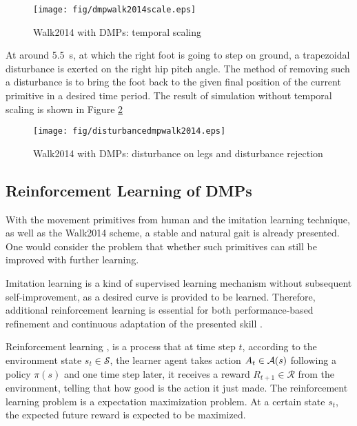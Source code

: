 \begin{figure}[H]
	\centering
	\texttt{[image: fig/dmpwalk2014scale.eps]}
	\caption{Walk2014 with DMPs: temporal scaling}
	\label{dmpwalk2014scale}
\end{figure}

At around \SI{5.5}{\second}, at which the right foot is going to step on ground, a trapezoidal disturbance is exerted on the right hip pitch angle. The method of removing such a disturbance is to bring the foot back to the given final position of the current primitive in a desired time period. The result of simulation without temporal scaling is shown in Figure {\ref{dmpwalk2014disturbance}}


\begin{figure}[H]
	\centering
	\texttt{[image: fig/disturbancedmpwalk2014.eps]}
	\caption{Walk2014 with DMPs: disturbance on legs and disturbance rejection}
	\label{dmpwalk2014disturbance}
\end{figure}


\subsection{Reinforcement Learning of DMPs}

With the movement primitives from human and the imitation learning technique, as well as the Walk2014 scheme, a stable and natural gait is already presented. One would consider the problem that whether such primitives can still be improved with further learning. 

Imitation learning is a kind of supervised learning mechanism without subsequent self-improvement, as a desired curve is provided to be learned. Therefore, additional reinforcement learning is essential
for both performance-based refinement and continuous adaptation of the presented skill \cite{kober2010imitation}.

Reinforcement learning \cite{sutton2018reinforcement}, is a process that at time step $ t $, according to the environment state $ s_t \in \mathcal{S}$, the learner agent takes action $ A_t \in \mathcal{A(\mathnormal{s})}$ following a policy $ \pi(s) $  and one time step later, it receives a reward $ R_{t+1} \in \mathcal{R}$ from the environment, telling that how good is the action it just made. The reinforcement learning problem is a expectation maximization problem. At a certain state $ s_t $, the expected future reward is expected to be maximized. 

